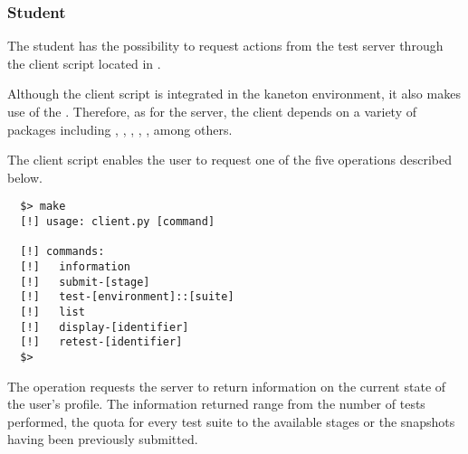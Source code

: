 \subsubsection{Student}

The student has the possibility to request actions from the test server
through the client script located in .


Although the client script is integrated in the kaneton environment, it also
makes use of the . Therefore, as for the server, the client depends
on a variety of  packages including , ,
, , ,  among others.


The client script enables the user to request one of the five operations
described below.

\begin{verbatim}
  $> make
  [!] usage: client.py [command]

  [!] commands:
  [!]   information
  [!]   submit-[stage]
  [!]   test-[environment]::[suite]
  [!]   list
  [!]   display-[identifier]
  [!]   retest-[identifier]
  $>
\end{verbatim}

The  operation requests the server to return information
on the current state of the user's profile. The information returned range
from the number of tests performed, the quota for every test suite to the
available stages or the snapshots having been previously submitted.

